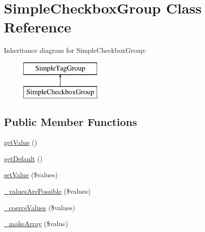 \hypertarget{class_simple_checkbox_group}{
\section{SimpleCheckboxGroup Class Reference}
\label{class_simple_checkbox_group}
}
Inheritance diagram for SimpleCheckboxGroup:\begin{figure}[H]
\begin{center}
\leavevmode
\includegraphics[height=2.000000cm]{class_simple_checkbox_group}
\end{center}
\end{figure}
\subsection*{Public Member Functions}
\begin{DoxyCompactItemize}
\item 
\hyperlink{class_simple_checkbox_group_a6b1347f1de590501b5ffe6c832c6ce3e}{getValue} ()
\item 
\hyperlink{class_simple_checkbox_group_afa20a2b8f875b255b3c87a71772221b6}{getDefault} ()
\item 
\hyperlink{class_simple_checkbox_group_a62af0724806496a31c75ffe0dc06d5b0}{setValue} (\$values)
\item 
\hyperlink{class_simple_checkbox_group_a7502967bd2c4adc191d9d1e8d1a7e8db}{\_\-valuesArePossible} (\$values)
\item 
\hyperlink{class_simple_checkbox_group_afe4a2ea02b092de7e39f158d793eda48}{\_\-coerceValues} (\$values)
\item 
\hyperlink{class_simple_checkbox_group_ae5034a9e6326cbb740d709b1b5c6defe}{\_\-makeArray} (\$value)
\end{DoxyCompactItemize}


